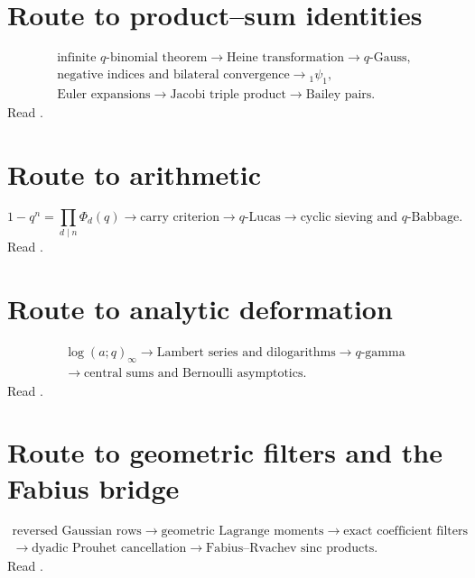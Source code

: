 \documentclass[11pt,a4paper,oneside,openany]{book}
\theoremstyle{definition}
\theoremstyle{remark}
\begin{document}
\section*{Route to product--sum identities}
\[
\begin{gathered}
 \text{infinite }q\text{-binomial theorem}
 \longrightarrow \text{Heine transformation}
 \longrightarrow q\text{-Gauss},\\
 \text{negative indices and bilateral convergence}
 \longrightarrow {}_1\psi_1,\\
 \text{Euler expansions}
 \longrightarrow \text{Jacobi triple product}
 \longrightarrow \text{Bailey pairs}.
\end{gathered}
\]
Read .

\section*{Route to arithmetic}
\[
 1-q^n=\prod_{d\mid n}\Phi_d(q)
 \longrightarrow \text{carry criterion}
 \longrightarrow q\text{-Lucas}
 \longrightarrow \text{cyclic sieving and }q\text{-Babbage}.
\]
Read .

\section*{Route to analytic deformation}
\[
\begin{gathered}
 \log(a;q)_\infty
 \longrightarrow \text{Lambert series and dilogarithms}
 \longrightarrow q\text{-gamma}\\
 \longrightarrow \text{central sums and Bernoulli asymptotics}.
\end{gathered}
\]
Read .

\section*{Route to geometric filters and the Fabius bridge}
\[
\begin{gathered}
 \text{reversed Gaussian rows}
 \longrightarrow \text{geometric Lagrange moments}
 \longrightarrow \text{exact coefficient filters}\\
 \longrightarrow \text{dyadic Prouhet cancellation}
 \longrightarrow \text{Fabius--Rvachev sinc products}.
\end{gathered}
\]
Read .
\end{document}
